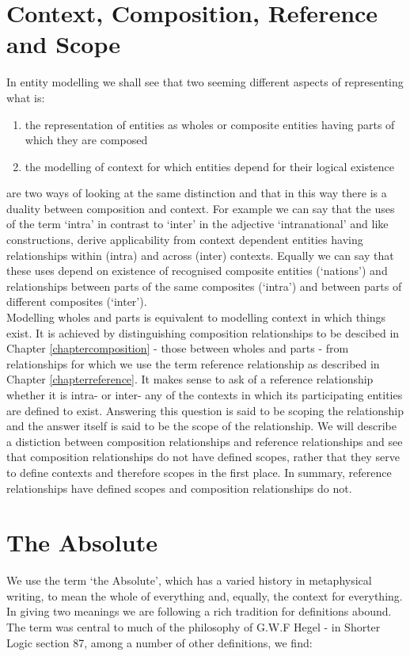 \section{Context, Composition, Reference and Scope}

\noindent In entity modelling we shall see that two seeming different aspects of representing what is:
\begin {enumerate}
\item the representation of entities as wholes or composite entities having parts of which they are composed
\item  the modelling of context for which entities depend for their logical existence                         
\end {enumerate}
are two ways of looking at the same distinction and that in this way there is a duality between composition and context. For example we can say that the uses of the term `intra' in contrast to `inter' in the  adjective `intranational' and like constructions, derive applicability from context dependent  entities having relationships within (intra) and across (inter) contexts. Equally we can say  that these uses depend on existence of recognised composite entities (`nations') and relationships between parts of the same composites (`intra') and between parts of different composites (`inter'). \\

\noindent Modelling wholes and parts is equivalent to modelling context in which things exist. It is achieved by  distinguishing composition relationships to be descibed in Chapter \ref{chaptercomposition} - those between wholes and parts - from relationships for which we use the term reference relationship as described in Chapter \ref{chapterreference}. It makes sense to ask of a reference relationship whether it is  intra- or inter- any of the contexts in which its participating entities are defined to exist. Answering this question is said to be scoping the relationship and the answer itself is said to be the scope of the relationship. We will describe a distiction between composition relationships and reference relationships and see that
composition relationships do not have defined scopes, rather that they serve to define contexts and therefore scopes in the first place.
In summary, reference relationships have defined scopes and composition relationships do not.\\

\section{The Absolute}
We use the term `the Absolute', which has a varied history in metaphysical writing, to mean the whole of everything and, equally, the context for everything. In giving two meanings we are following a rich tradition for definitions abound. The term was central to much of the philosophy of G.W.F Hegel - in Shorter Logic section 87, among a number of other definitions, we find:

